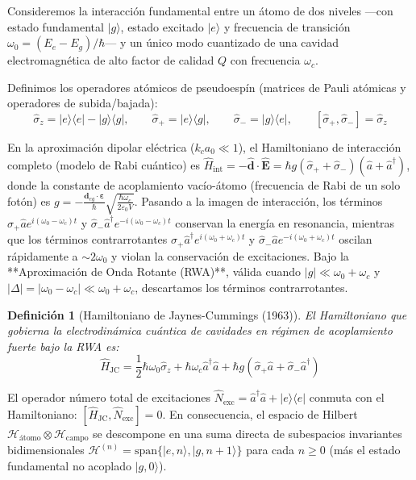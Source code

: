 \documentclass[11pt,a4paper]{book}
\newtheorem{definicion}{Definición}[chapter]
\begin{document}
Consideremos la interacción fundamental entre un átomo de dos niveles —con estado fundamental $|g\rangle$, estado excitado $|e\rangle$ y frecuencia de transición $\omega_0 = (E_e - E_g)/\hbar$— y un único modo cuantizado de una cavidad electromagnética de alto factor de calidad $Q$ con frecuencia $\omega_c$.

Definimos los operadores atómicos de pseudoespín (matrices de Pauli atómicas y operadores de subida/bajada):
\begin{equation}
\hat{\sigma}_z = |e\rangle\langle e| - |g\rangle\langle g|, \qquad \hat{\sigma}_+ = |e\rangle\langle g|, \qquad \hat{\sigma}_- = |g\rangle\langle e|, \qquad [\hat{\sigma}_+, \hat{\sigma}_-] = \hat{\sigma}_z
\end{equation}

En la aproximación dipolar eléctrica ($k_c a_0 \ll 1$), el Hamiltoniano de interacción completo (modelo de Rabi cuántico) es $\hat{H}_{\text{int}} = -\hat{\mathbf{d}}\cdot\hat{\mathbf{E}} = \hbar g (\hat{\sigma}_+ + \hat{\sigma}_-)(\hat{a} + \hat{a}^\dagger)$, donde la constante de acoplamiento vacío-átomo (frecuencia de Rabi de un solo fotón) es $g = -\frac{\mathbf{d}_{eg}\cdot\bm{\varepsilon}}{\hbar}\sqrt{\frac{\hbar\omega_c}{2\varepsilon_0 V}}$. Pasando a la imagen de interacción, los términos $\hat{\sigma}_+ \hat{a} e^{i(\omega_0 - \omega_c)t}$ y $\hat{\sigma}_- \hat{a}^\dagger e^{-i(\omega_0 - \omega_c)t}$ conservan la energía en resonancia, mientras que los términos contrarrotantes $\hat{\sigma}_+ \hat{a}^\dagger e^{i(\omega_0 + \omega_c)t}$ y $\hat{\sigma}_- \hat{a} e^{-i(\omega_0 + \omega_c)t}$ oscilan rápidamente a $\sim 2\omega_0$ y violan la conservación de excitaciones. Bajo la **Aproximación de Onda Rotante (RWA)**, válida cuando $|g| \ll \omega_0 + \omega_c$ y $|\Delta| = |\omega_0 - \omega_c| \ll \omega_0 + \omega_c$, descartamos los términos contrarrotantes.

\begin{definicion}[Hamiltoniano de Jaynes-Cummings (1963)]
El Hamiltoniano que gobierna la electrodinámica cuántica de cavidades en régimen de acoplamiento fuerte bajo la RWA es:
\begin{equation}
\hat{H}_{\text{JC}} = \frac{1}{2}\hbar\omega_0 \hat{\sigma}_z + \hbar\omega_c \hat{a}^\dagger \hat{a} + \hbar g \left( \hat{\sigma}_+ \hat{a} + \hat{\sigma}_- \hat{a}^\dagger \right)
\end{equation}
\end{definicion}

El operador número total de excitaciones $\hat{N}_{\text{exc}} = \hat{a}^\dagger\hat{a} + |e\rangle\langle e|$ conmuta con el Hamiltoniano: $[\hat{H}_{\text{JC}}, \hat{N}_{\text{exc}}] = 0$. En consecuencia, el espacio de Hilbert $\mathcal{H}_{\text{átomo}} \otimes \mathcal{H}_{\text{campo}}$ se descompone en una suma directa de subespacios invariantes bidimensionales $\mathcal{H}^{(n)} = \text{span}\{|e, n\rangle, |g, n+1\rangle\}$ para cada $n \geq 0$ (más el estado fundamental no acoplado $|g, 0\rangle$).
\end{document}
